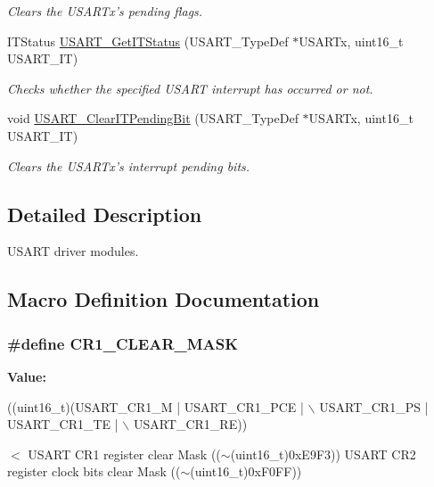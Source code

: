 \begin{DoxyCompactItemize}
\begin{DoxyCompactList}\small\item\em Clears the U\-S\-A\-R\-Tx's pending flags. \end{DoxyCompactList}\item 
I\-T\-Status \hyperlink{group___u_s_a_r_t_ga93d8f031241bcdbe938d091a85295445}{U\-S\-A\-R\-T\-\_\-\-Get\-I\-T\-Status} (U\-S\-A\-R\-T\-\_\-\-Type\-Def $\ast$U\-S\-A\-R\-Tx, uint16\-\_\-t U\-S\-A\-R\-T\-\_\-\-I\-T)
\begin{DoxyCompactList}\small\item\em Checks whether the specified U\-S\-A\-R\-T interrupt has occurred or not. \end{DoxyCompactList}\item 
void \hyperlink{group___u_s_a_r_t_ga1fc25d0338695063be5e50156955d9bc}{U\-S\-A\-R\-T\-\_\-\-Clear\-I\-T\-Pending\-Bit} (U\-S\-A\-R\-T\-\_\-\-Type\-Def $\ast$U\-S\-A\-R\-Tx, uint16\-\_\-t U\-S\-A\-R\-T\-\_\-\-I\-T)
\begin{DoxyCompactList}\small\item\em Clears the U\-S\-A\-R\-Tx's interrupt pending bits. \end{DoxyCompactList}\end{DoxyCompactItemize}


\subsection{Detailed Description}
U\-S\-A\-R\-T driver modules. 

\subsection{Macro Definition Documentation}
\hypertarget{group___u_s_a_r_t_ga8d425258898b4af4ebc820f52635fad8}{
\subsubsection[{C\-R1\-\_\-\-C\-L\-E\-A\-R\-\_\-\-M\-A\-S\-K}]{\setlength{\rightskip}{0pt plus 5cm}\#define C\-R1\-\_\-\-C\-L\-E\-A\-R\-\_\-\-M\-A\-S\-K}}\label{group___u_s_a_r_t_ga8d425258898b4af4ebc820f52635fad8}
{\bfseries Value\-:}
\begin{DoxyCode}
((uint16\_t)(USART\_CR1\_M | USART\_CR1\_PCE | \(\backslash\)
                                              USART\_CR1\_PS | USART\_CR1\_TE | \(\backslash\)
                                              USART\_CR1\_RE))
\end{DoxyCode}
$<$ U\-S\-A\-R\-T C\-R1 register clear Mask (($\sim$(uint16\-\_\-t)0x\-E9\-F3)) U\-S\-A\-R\-T C\-R2 register clock bits clear Mask (($\sim$(uint16\-\_\-t)0x\-F0\-F\-F)) 


